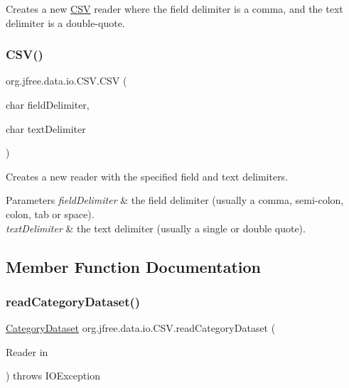 Creates a new \mbox{\hyperlink{classorg_1_1jfree_1_1data_1_1io_1_1_c_s_v}{C\+SV}} reader where the field delimiter is a comma, and the text delimiter is a double-\/quote. \mbox{\label{classorg_1_1jfree_1_1data_1_1io_1_1_c_s_v_aa08388aa9f6a362da9d67493c570eee3}} 
\subsubsection{\texorpdfstring{C\+S\+V()}{CSV()}\hspace{0.1cm}{\footnotesize\ttfamily [2/2]}}
{\footnotesize\ttfamily org.\+jfree.\+data.\+io.\+C\+S\+V.\+C\+SV (\begin{DoxyParamCaption}\item[{char}]{field\+Delimiter,  }\item[{char}]{text\+Delimiter }\end{DoxyParamCaption})}

Creates a new reader with the specified field and text delimiters.


\begin{DoxyParams}{Parameters}
{\em field\+Delimiter} & the field delimiter (usually a comma, semi-\/colon, colon, tab or space). \\
\hline
{\em text\+Delimiter} & the text delimiter (usually a single or double quote). \\
\hline
\end{DoxyParams}


\subsection{Member Function Documentation}
\mbox{\label{classorg_1_1jfree_1_1data_1_1io_1_1_c_s_v_a752948180e1d597aa35f3473a2a1698f}} 
\subsubsection{\texorpdfstring{read\+Category\+Dataset()}{readCategoryDataset()}}
{\footnotesize\ttfamily \mbox{\hyperlink{interfaceorg_1_1jfree_1_1data_1_1category_1_1_category_dataset}{Category\+Dataset}} org.\+jfree.\+data.\+io.\+C\+S\+V.\+read\+Category\+Dataset (\begin{DoxyParamCaption}\item[{Reader}]{in }\end{DoxyParamCaption}) throws I\+O\+Exception}

